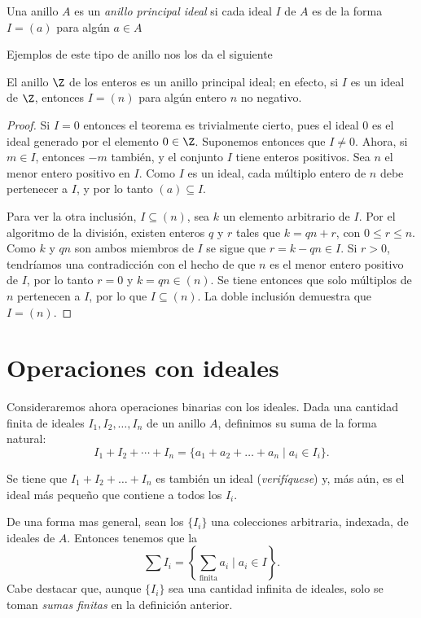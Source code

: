 \begin{defi} 
	Una anillo $A$ es un \textit{anillo principal ideal} si cada ideal $I$ de $A$ es de la forma $I=(a)$ para algún $a \in A$
\end{defi} 
%
Ejemplos de este tipo de anillo nos los da el siguiente
\begin{teo} 
	El anillo $\Z$ de los enteros es un anillo principal ideal; en efecto, si $I$ es un ideal de $\Z$, entonces $I=(n)$ para algún entero $n$ no negativo.
\end{teo} 
\begin{proof}
	Si $I=0$ entonces el teorema es trivialmente cierto, pues el ideal $0$ es el ideal generado por el elemento $0 \in \Z$. Suponemos entonces que $I \neq 0$. Ahora, si $m \in I$, entonces $-m$ también, y el conjunto $I$ tiene enteros positivos. Sea $n$ el menor entero positivo en $I$. Como $I$ es un ideal, cada múltiplo entero de $n$ debe pertenecer a $I$, y por lo tanto $(a) \subseteq I$.
	
	Para ver la otra inclusión, $I \subseteq (n)$, sea $k$ un elemento arbitrario de $I$. Por el algoritmo de la división, existen enteros $q$ y $r$ tales que $k = qn+r$, con $0 \leq r \leq n$. Como $k$ y $qn$ son ambos miembros de $I$ se sigue que $r = k-qn \in I$. Si $r>0$, tendríamos una contradicción con el hecho de que $n$ es el menor entero positivo de $I$, por lo tanto $r = 0$ y $k = qn \in (n)$. Se tiene entonces que solo múltiplos de $n$ pertenecen a $I$, por lo que $I \subseteq (n)$. La doble inclusión demuestra que $I=(n)$.
\end{proof}
%
\section{Operaciones con ideales}
Consideraremos ahora operaciones binarias con los ideales. Dada una cantidad finita de ideales $I_1,I_2,\dots,I_n$ de un anillo $A$, definimos su suma de la forma natural:
\[ I_1+I_2+\cdots+I_n = \{ a_1+a_2+\dots+a_n \mid a_i \in I_i \}. \]

Se tiene que $I_1+I_2+\dots+I_n$ es también un ideal ({\it verifíquese}) y, más aún, es el ideal más pequeño que contiene a todos los $I_i$.

De una forma mas general, sean los $\{I_i\}$ una colecciones arbitraria, indexada, de ideales de $A$. Entonces tenemos que la 
\[ \sum I_i = \left\{ \sum_{\text{finita}} a_i \mid a_i \in I \right\}. \]
Cabe destacar que, aunque $\{I_i\}$ sea una cantidad infinita de ideales, solo se toman \textit{sumas finitas} en la definición anterior.

